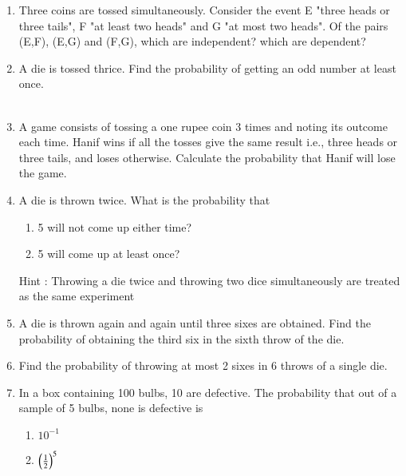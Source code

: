 \begin{enumerate}[label=\thesection.\arabic*.,ref=\thesection.\theenumi]
\item Three coins are tossed simultaneously. Consider the event E "three heads or three tails", F "at least two heads" and G "at most two heads". Of the pairs (E,F), (E,G) and (F,G), which are independent? which are dependent?\\
\solution

\item A die is tossed thrice. Find the probability of getting an odd number at least once.\\
\\
\solution

\item A game consists of tossing a one rupee coin 3 times and noting its outcome each time. Hanif wins if all the tosses give the same result i.e., three heads or three tails, and loses otherwise. Calculate the probability that Hanif will lose the game.
\\
\solution

\item A die is thrown twice. What is the probability that\\
\begin{enumerate}[label=(\roman*)]
\item  5 will not come up either time? \\
\item  5 will come up at least once?\\
\end{enumerate}
Hint : Throwing a die twice and throwing two dice simultaneously are treated as the
same experiment
\\
\solution

\item A die is thrown again and again until three sixes are obtained. Find the probability of obtaining the third six in the sixth throw of the die.\\
\solution

%
\item Find the probability of throwing at most 2 sixes in 6 throws of a single die.\\
\solution

%
\item In a box containing 100 bulbs, 10 are defective. The probability that out of a
sample of 5 bulbs, none is defective is
\begin{enumerate}
\item $10^{-1}$
\item $\left(\frac{1}{2}\right)^5$

\end{enumerate}
\end{enumerate}
